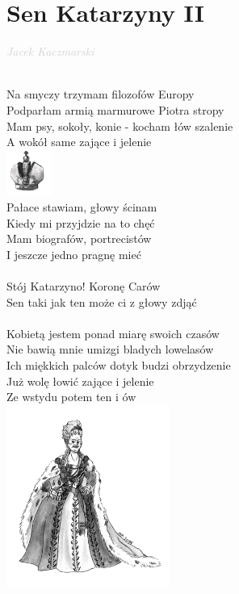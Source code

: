 \documentclass[a5paper, 10pt]{book}
\begin{document}
\newpage
\section{Sen Katarzyny II}\textcolor{lightgray}{\textit{Jacek Kaczmarski}}\\~\\
\begin{minipage}[t]{0.85\textwidth}
Na smyczy trzymam filozofów Europy\\
Podparłam armią marmurowe Piotra stropy\\
Mam psy, sokoły, konie - kocham łów szalenie\\
A wokół same zające i jelenie\\
\hspace*{6cm}\includegraphics[height=1.5cm]{images/sen_katarzyny_1.png}\vspace*{-1.6cm}\\
Pałace stawiam, głowy ścinam\\
Kiedy mi przyjdzie na to chęć\\
Mam biografów, portrecistów\\
I jeszcze jedno pragnę mieć\\
\\
\hspace*{5mm}Stój Katarzyno! Koronę Carów\\
\hspace*{5mm}Sen taki jak ten może ci z głowy zdjąć\\
\\
Kobietą jestem ponad miarę swoich czasów\\
Nie bawią mnie umizgi bladych lowelasów\\
Ich miękkich palców dotyk budzi obrzydzenie\\
Już wolę łowić zające i jelenie\\
Ze wstydu potem ten i ów\\
\hspace*{6cm}\includegraphics[height=6cm]{images/sen_katarzyny_2.png}\vspace*{-6.1cm}\\

\end{minipage}
\end{document}
